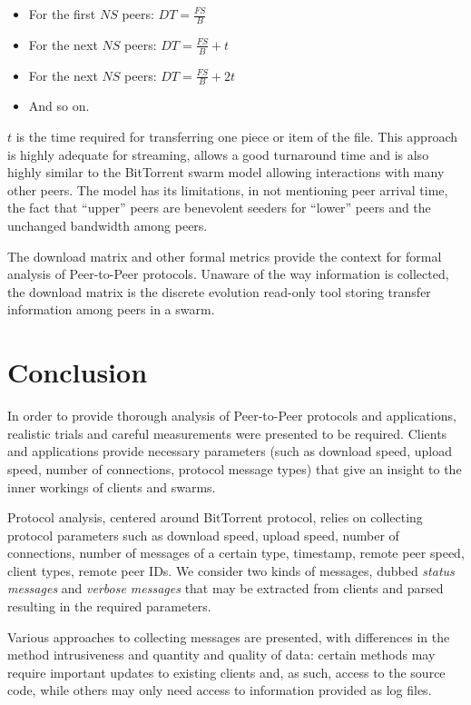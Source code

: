 \begin{itemize}
  \item For the first $NS$ peers: $DT = \frac{FS}{B}$
  \item For the next $NS$ peers: $DT = \frac{FS}{B} + t$
  \item For the next $NS$ peers: $DT = \frac{FS}{B} + 2t$
  \item And so on.
\end{itemize}

$t$ is the time required for transferring one piece or item of the file. This
approach is highly adequate for streaming, allows a good turnaround time and
is also highly similar to the BitTorrent swarm model allowing interactions
with many other peers. The model has its limitations, in not mentioning peer
arrival time, the fact that ``upper'' peers are benevolent seeders for
``lower'' peers and the unchanged bandwidth among peers.

The download matrix and other formal metrics provide the context for formal
analysis of Peer-to-Peer protocols. Unaware of the way information is
collected, the download matrix is the discrete evolution read-only tool
storing transfer information among peers in a swarm.

\section{Conclusion}
\label{sec:proto-measure:conclusion}

In order to provide thorough analysis of Peer-to-Peer protocols and
applications, realistic trials and careful measurements were presented to be
required. Clients and applications provide necessary parameters (such as
download speed, upload speed, number of connections, protocol message types)
that give an insight to the inner workings of clients and swarms.

Protocol analysis, centered around BitTorrent protocol, relies on collecting
protocol parameters such as download speed, upload speed, number of
connections, number of messages of a certain type, timestamp, remote peer
speed, client types, remote peer IDs. We consider two kinds of messages,
dubbed \textit{status messages} and \textit{verbose messages} that may be
extracted from clients and parsed resulting in the required parameters.

Various approaches to collecting messages are presented, with differences in
the method intrusiveness and quantity and quality of data: certain methods may
require important updates to existing clients and, as such, access to the
source code, while others may only need access to information provided as log
files.

